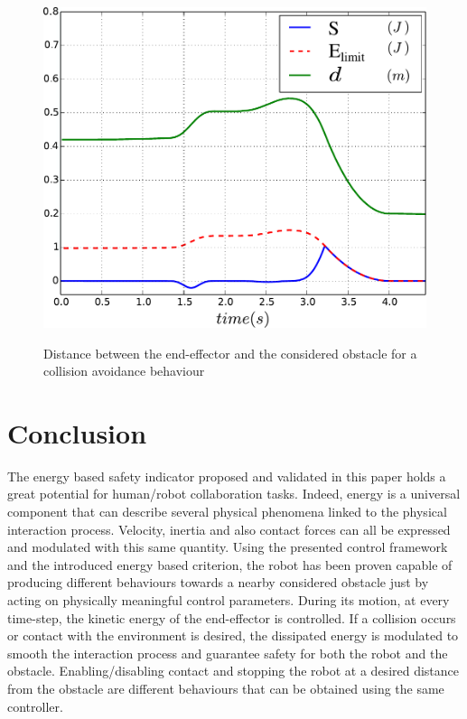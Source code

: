 \documentclass[a4paper, 10pt, conference]{ieeeconf}      %
\begin{document}
\begin{figure}[h]
\centering
{\includegraphics[width=0.9\columnwidth]{figures/Dist_wO_woC_wEc}}
\caption{Distance between the end-effector and the considered obstacle for a collision avoidance behaviour} 
\label{fig:Dist_wO_woC_wEc}
\end{figure}



\section{Conclusion}

The energy based safety indicator proposed and validated in this paper holds a great potential for human/robot collaboration tasks. Indeed, energy is a universal component that can describe several physical phenomena linked to the physical interaction process. Velocity, inertia and also contact forces can all be expressed and modulated with this same quantity. Using the presented control framework and the introduced energy based criterion, the robot has been proven capable of producing different behaviours towards a nearby considered obstacle just by acting on physically meaningful  control parameters. During its motion, at every time-step, the kinetic energy of the  end-effector is controlled. If a collision occurs or contact with the environment is desired, the dissipated energy is modulated to smooth the interaction process  and guarantee safety for both the robot and the obstacle. Enabling/disabling contact and stopping the robot at a desired distance from the obstacle are different behaviours that can be obtained using the same controller.
\end{document}

